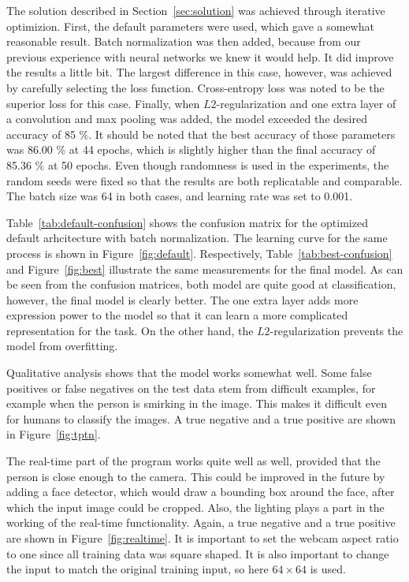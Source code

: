 \documentclass{article}
\begin{document}
The solution described in Section~\ref{sec:solution} was achieved
through iterative optimizion. First, the default parameters were used,
which gave a somewhat reasonable result. Batch normalization was then
added, because from our previous experience with neural networks we
knew it would help. It did improve the results a little bit. The
largest difference in this case, however, was achieved by carefully
selecting the loss function. Cross-entropy loss was noted to be the
superior loss for this case. Finally, when $L2$-regularization and one
extra layer of a convolution and max pooling was added, the model
exceeded the desired accuracy of 85 \%. It should be noted that the
best accuracy of those parameters was 86.00 \% at 44 epochs, which is
slightly higher than the final accuracy of 85.36 \% at 50 epochs. Even
though randomness is used in the experiments, the random seeds were
fixed so that the results are both replicatable and comparable. The
batch size was 64 in both cases, and learning rate was set to 0.001.

Table~\ref{tab:default-confusion} shows the confusion matrix for the
optimized default arhcitecture with batch normalization. The learning
curve for the same process is shown in Figure~\ref{fig:default}.
Respectively, Table~\ref{tab:best-confusion} and Figure~\ref{fig:best}
illustrate the same measurements for the final model. As can be seen
from the confusion matrices, both model are quite good at
classification, however, the final model is clearly better. The one
extra layer adds more expression power to the model so that it can
learn a more complicated representation for the task. On the other
hand, the $L2$-regularization prevents the model from overfitting.

Qualitative analysis shows that the model works somewhat well. Some
false positives or false negatives on the test data stem from
difficult examples, for example when the person is smirking in the
image. This makes it difficult even for humans to classify the images.
A true negative and a true positive are shown in
Figure~\ref{fig:tptn}.

The real-time part of the program works quite well as well, provided
that the person is close enough to the camera. This could be improved
in the future by adding a face detector, which would draw a bounding
box around the face, after which the input image could be cropped.
Also, the lighting plays a part in the working of the real-time
functionality. Again, a true negative and a true positive are shown in
Figure~\ref{fig:realtime}. It is important to set the webcam aspect
ratio to one since all training data was square shaped. It is also
important to change the input to match the original training input, so
here $64 \times 64$ is used.
\end{document}
